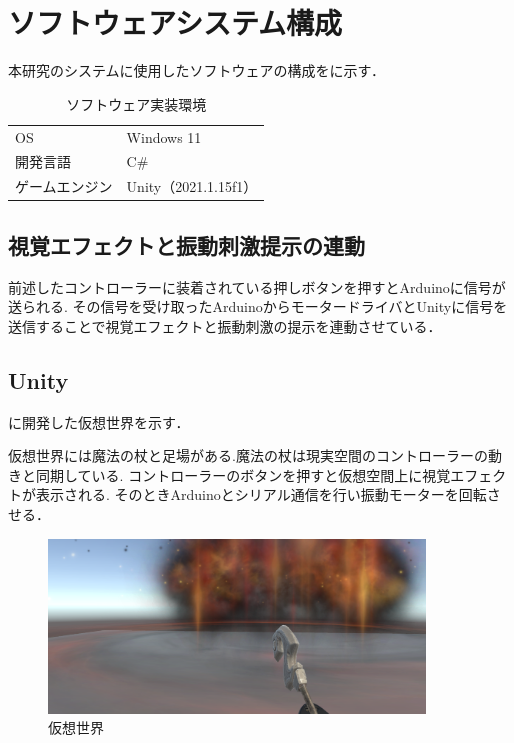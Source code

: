 \section{ソフトウェアシステム構成}
本研究のシステムに使用したソフトウェアの構成をに示す．

\begin{table}[h]
    \caption{\label{tab;software}ソフトウェア実装環境}
    \centering
    \begin{tabular}{l|l}
    \hline
    \hline
    OS & Windows 11\\
    開発言語 & C\#\\
    ゲームエンジン & Unity（2021.1.15f1）\\
    \hline
    \end{tabular}
\end{table}

\subsection{視覚エフェクトと振動刺激提示の連動}
前述したコントローラーに装着されている押しボタンを押すとArduinoに信号が送られる.
その信号を受け取ったArduinoからモータードライバとUnityに信号を送信することで視覚エフェクトと振動刺激の提示を連動させている．

\subsection{Unity}
に開発した仮想世界を示す．

仮想世界には魔法の杖と足場がある.魔法の杖は現実空間のコントローラーの動きと同期している.
コントローラーのボタンを押すと仮想空間上に視覚エフェクトが表示される.
そのときArduinoとシリアル通信を行い振動モーターを回転させる．

\begin{figure}[h]
\centering
\includegraphics[clip,width=10cm]{fig/unity.png}
\caption{仮想世界}\label{virtualworld}
\end{figure}